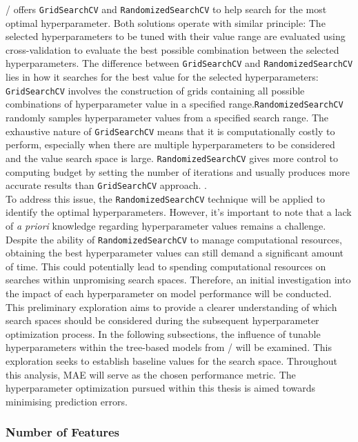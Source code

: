 \scikit/ offers {\tt GridSearchCV} and {\tt RandomizedSearchCV} to help search for the most optimal hyperparameter. Both solutions operate with similar principle: The selected hyperparameters to be tuned with their value range are evaluated using cross-validation to evaluate the best possible combination between the selected hyperparameters. The difference between {\tt GridSearchCV} and {\tt RandomizedSearchCV} lies in how it searches for the best value for the selected hyperparameters: {\tt GridSearchCV} involves the construction of grids containing all possible combinations of hyperparameter value in a specified range.{\tt RandomizedSearchCV} randomly samples hyperparameter values from a specified search range. The exhaustive nature of {\tt GridSearchCV} means that it is computationally costly to perform, especially when there are multiple hyperparameters to be considered and the value search space is large. {\tt RandomizedSearchCV} gives more control to computing budget by setting the number of iterations and usually produces more accurate results than {\tt GridSearchCV} approach. . \\

To address this issue, the {\tt RandomizedSearchCV} technique will be applied to identify the optimal hyperparameters. However, it's important to note that a lack of \emph{a priori} knowledge regarding hyperparameter values remains a challenge. Despite the ability of {\tt RandomizedSearchCV} to manage computational resources, obtaining the best hyperparameter values can still demand a significant amount of time. This could potentially lead to spending computational resources on searches within unpromising search spaces. Therefore, an initial investigation into the impact of each hyperparameter on model performance will be conducted. This preliminary exploration aims to provide a clearer understanding of which search spaces should be considered during the subsequent hyperparameter optimization process. In the following subsections, the influence of tunable hyperparameters within the tree-based models from \scikit/ will be examined. This exploration seeks to establish baseline values for the search space. Throughout this analysis, MAE will serve as the chosen performance metric. The hyperparameter optimization pursued within this thesis is aimed towards minimising prediction errors.\\

\subsubsection*{Number of Features}\label{sec:max_features}

